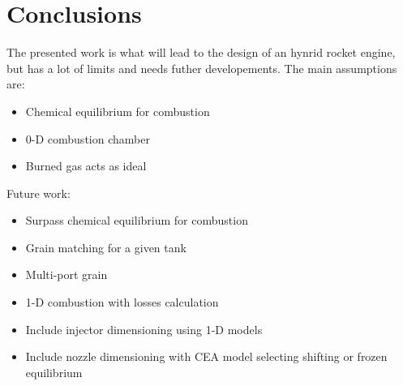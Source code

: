\chapter{Conclusions}
The presented work is what will lead to the design of an hynrid rocket engine,
but has a lot of limits and needs futher developements.
The main assumptions are:
\begin{itemize}
	\item Chemical equilibrium for combustion
	\item 0-D combustion chamber
	\item Burned gas acts as ideal
\end{itemize}
Future work:
\begin{itemize}
	\item Surpass chemical equilibrium for combustion
	\item Grain matching for a given tank
	\item Multi-port grain
	\item 1-D combustion with losses calculation
	\item Include injector dimensioning using 1-D models
	\item Include nozzle dimensioning with CEA model selecting shifting or frozen equilibrium
\end{itemize}
